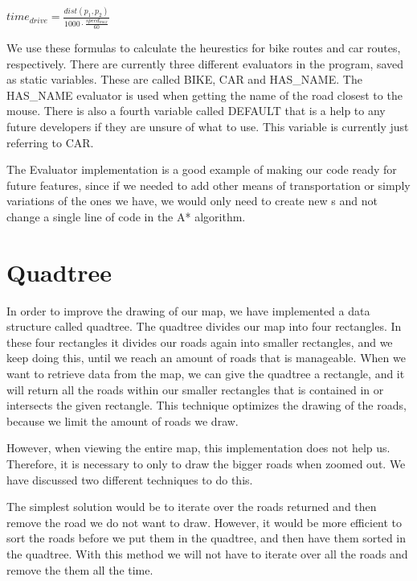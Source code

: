 \begin{center}
$
time_{drive}=\frac{dist(p_{1},p_{2})}{1000\cdot \frac {speed_{max}}{60}}
$
\end{center}

We use these formulas to calculate the heurestics for bike routes and car routes, respectively.
There are currently three different evaluators in the program, saved as static variables. These
are called BIKE, CAR and HAS\_NAME. The HAS\_NAME evaluator is used when getting
the name of the road closest to the mouse. There is also a fourth variable called DEFAULT that 
is a help to any future developers if they are unsure of what to use. This variable is currently just 
referring to CAR. 

The Evaluator implementation is a good example of making our code ready for future features, 
since if we needed to add other means of transportation or simply variations of the ones 
we have, we would only need to create new s and not change 
a single line of code in the A* algorithm.

\section{Quadtree}
\label{IMPL-QT}
In order to improve the drawing of our map, we have implemented a data structure
called quadtree. The quadtree divides our map into four rectangles. In these four rectangles 
it divides our roads again into smaller rectangles, and we keep doing this, until we reach
an amount of roads that is manageable.
When we want to retrieve data from the map, we can give the quadtree a
rectangle, and it will return all the roads within our smaller rectangles that
is contained in or intersects the given rectangle. This technique optimizes the
drawing of the roads, because we limit the amount of roads we draw.

However, when viewing the entire map, this implementation does not help
us. Therefore, it is necessary to only to draw the bigger roads when zoomed out. We
have discussed two different techniques to do this.

The simplest solution would be to iterate over the roads returned and then
remove the road we do not want to draw. However, it would be more efficient to sort the
roads before we put them in the quadtree, and then have them sorted in the quadtree.
With this method we will not have to iterate over all the roads and remove the
them all the time.


